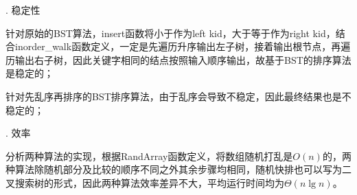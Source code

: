 \documentclass[twoside,a4paper]{article}
\begin{document}
\begin{CJK*}{UTF8}{gkai}
. 稳定性

针对原始的BST算法，insert函数将小于作为left kid，大于等于作为right kid，结合inorder\_walk函数定义，一定是先遍历升序输出左子树，接着输出根节点，再遍历输出右子树，因此关键字相同的结点按照输入顺序输出，故基于BST的排序算法是稳定的；

针对先乱序再排序的BST排序算法，由于乱序会导致不稳定，因此最终结果也是不稳定的；

. 效率

分析两种算法的实现，根据RandArray函数定义，将数组随机打乱是$O(n)$的，两种算法除随机部分及比较的顺序不同之外其余步骤均相同，随机快排也可以写为二叉搜索树的形式，因此两种算法效率差异不大，平均运行时间均为$\Theta (n\lg n)$。


\end{CJK*}
\end{document}
